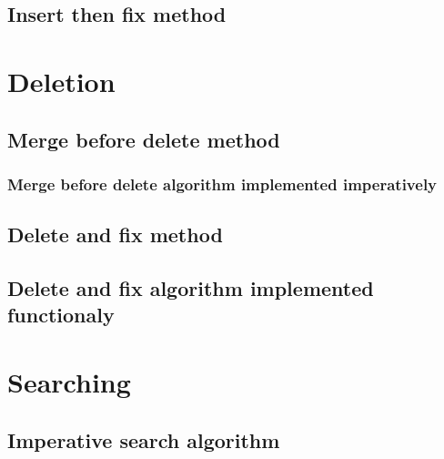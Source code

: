 \documentclass{article}
\begin{document}
\subsection{Insert then fix method}

\section{Deletion} 

\subsection{Merge before delete method} 

\subsubsection{Merge before delete algorithm implemented imperatively}



\subsection{Delete and fix method}

\subsection{Delete and fix algorithm implemented functionaly}

\section{Searching} 

\subsection{Imperative search algorithm}
\end{document}
